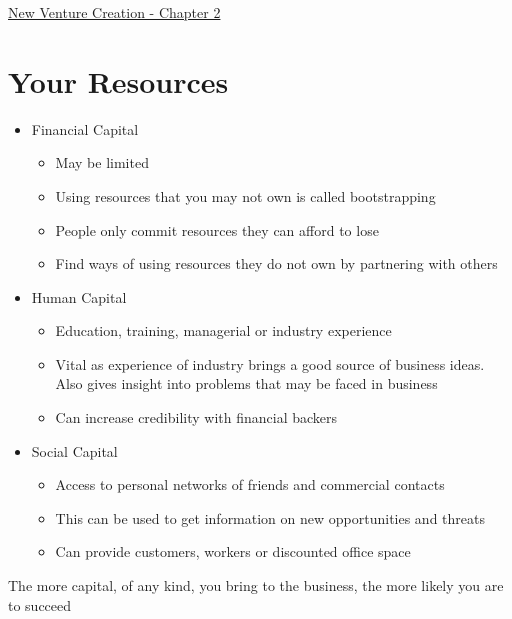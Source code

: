 \documentclass{article}[18pt]
\begin{document}
\begin{center}
\underline{\huge New Venture Creation - Chapter 2}
\end{center}

\section{Your Resources}
\begin{itemize}
\item Financial Capital
\begin{itemize}
\item May be limited
\item Using resources that you may not own is called bootstrapping
\item People only commit resources they can afford to lose
\item Find ways of using resources they do not own by partnering with others
\end{itemize}

\item Human Capital
\begin{itemize}
\item Education, training, managerial or industry experience
\item Vital as experience of industry brings a good source of business ideas. Also gives insight into problems that may be faced in business
\item Can increase credibility with financial backers
\end{itemize}

\item Social Capital
\begin{itemize}
\item Access to personal networks of friends and commercial contacts
\item This can be used to get information on new opportunities and threats
\item Can provide customers, workers or discounted office space
\end{itemize}
\end{itemize}
The more capital, of any kind, you bring to the business, the more likely you are to succeed
\end{document}
